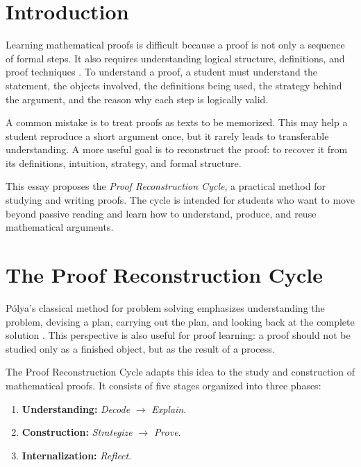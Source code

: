 \documentclass[11pt,a4paper]{article}
\begin{document}
\section{Introduction}

Learning mathematical proofs is difficult because a proof is not only a sequence of formal steps. It also requires understanding logical structure, definitions, and proof techniques \cite{velleman2019how}. To understand a proof, a student must understand the statement, the objects involved, the definitions being used, the strategy behind the argument, and the reason why each step is logically valid.

A common mistake is to treat proofs as texts to be memorized. This may help a student reproduce a short argument once, but it rarely leads to transferable understanding. A more useful goal is to reconstruct the proof: to recover it from its definitions, intuition, strategy, and formal structure.

This essay proposes the \emph{Proof Reconstruction Cycle}, a practical method for studying and writing proofs. The cycle is intended for students who want to move beyond passive reading and learn how to understand, produce, and reuse mathematical arguments.

\section{The Proof Reconstruction Cycle}

P{\'o}lya's classical method for problem solving emphasizes understanding the problem, devising a plan, carrying out the plan, and looking back at the complete solution \cite{polya2004how}. This perspective is also useful for proof learning: a proof should not be studied only as a finished object, but as the result of a process.

The Proof Reconstruction Cycle adapts this idea to the study and construction of mathematical proofs. It consists of five stages organized into three phases:

\begin{enumerate}[label=\arabic*., leftmargin=*]
    \item \textbf{Understanding:} \emph{Decode} \(\rightarrow\) \emph{Explain}.
    \item \textbf{Construction:} \emph{Strategize} \(\rightarrow\) \emph{Prove}.
    \item \textbf{Internalization:} \emph{Reflect}.
\end{enumerate}
\end{document}
